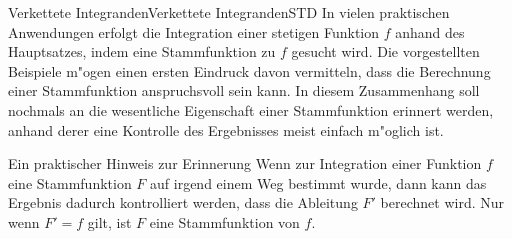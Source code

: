 \begin{MXContent}{Verkettete Integranden}{Verkettete Integranden}{STD}
In vielen praktischen Anwendungen erfolgt die Integration einer stetigen 
Funktion $f$ anhand des Hauptsatzes, indem eine Stammfunktion zu $f$ gesucht 
wird. Die vorgestellten Beispiele m"ogen einen ersten Eindruck davon 
vermitteln, dass die Berechnung einer Stammfunktion anspruchsvoll sein kann.
In diesem Zusammenhang soll nochmals an die wesentliche Eigenschaft einer 
Stammfunktion erinnert werden, anhand derer eine Kontrolle des Ergebnisses
meist einfach m"oglich ist.

\begin{MXInfo}{Ein praktischer Hinweis zur Erinnerung}
Wenn zur Integration einer Funktion $f$ eine Stammfunktion $F$ auf irgend 
einem Weg bestimmt wurde, dann kann das Ergebnis dadurch kontrolliert werden, 
dass die Ableitung $F'$ berechnet wird. Nur wenn $F' = f$ gilt, ist $F$ eine 
Stammfunktion von $f$.
\end{MXInfo}
\end{MXContent}





